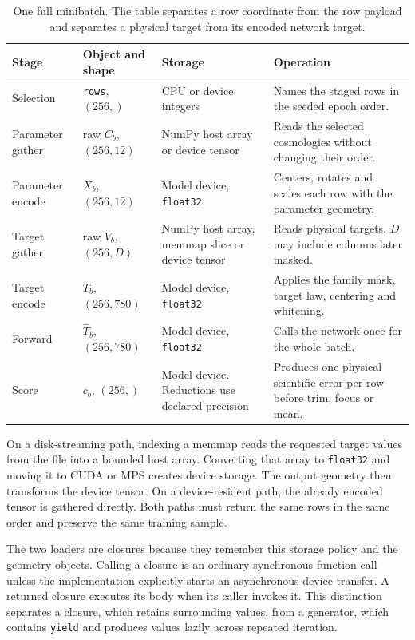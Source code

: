 \documentclass[10pt,aps,prd,twocolumn,nofootinbib]{revtex4-2}
\newcommand{\code}[1]{\texttt{#1}}
\begin{document}
\begin{table}[t]
\centering
\begin{tabular}{p{}p{}p{}p{}}
\toprule
Stage & Object and shape & Storage & Operation \\
\midrule
Selection & \code{rows}, $(256,)$ & CPU or device integers & Names the staged
rows in the seeded epoch order.  \\
Parameter gather & raw $C_b$, $(256,12)$ & NumPy host array or device tensor &
Reads the selected cosmologies without changing their order.  \\
Parameter encode & $X_b$, $(256,12)$ & Model device, \code{float32} & Centers,
rotates and scales each row with the parameter geometry.  \\
Target gather & raw $V_b$, $(256,D)$ & NumPy host array, memmap slice or device
tensor & Reads physical targets. $D$ may include columns later masked.  \\
Target encode & $T_b$, $(256,780)$ & Model device, \code{float32} & Applies the
family mask, target law, centering and whitening.  \\
Forward & $\widehat T_b$, $(256,780)$ & Model device, \code{float32} & Calls the
network once for the whole batch.  \\
Score & $c_b$, $(256,)$ & Model device.  Reductions use declared precision &
Produces one physical scientific error per row before trim, focus or mean.  \\
\bottomrule
\end{tabular}
\caption{One full minibatch.  The table separates a row coordinate from the
row payload and separates a physical target from its encoded network target.}
\end{table}

On a disk-streaming path, indexing a memmap reads the requested target values
from the file into a bounded host array.  Converting that array to
\code{float32} and moving it to CUDA or MPS creates device storage.  The
output geometry then transforms the device tensor.  On a device-resident path,
the already encoded tensor is gathered directly.  Both paths must return the
same rows in the same order and preserve the same training sample.

The two loaders are closures because they remember this storage policy and
the geometry objects.  Calling a closure is an ordinary synchronous function
call unless the implementation explicitly starts an asynchronous device
transfer.  A returned closure executes its body when its caller invokes it.
This distinction separates a
closure, which retains surrounding values, from a generator, which contains
\code{yield} and produces values lazily across repeated iteration.
\end{document}
